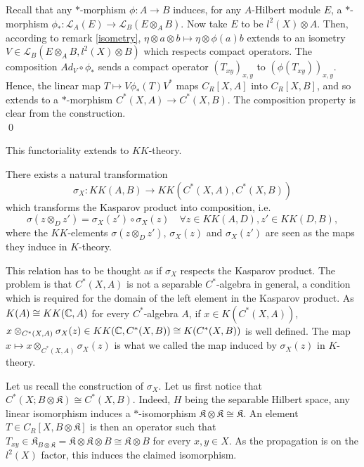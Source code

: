 \begin{dem}
Recall that any $*$-morphism $\phi : A\rightarrow B$ induces, for any $A$-Hilbert module $E$, a $*$-morphism $\phi_* : \mathcal L_A(E)\rightarrow \mathcal L_B(E\otimes_A B)$. Now take $E$ to be $l^2(X)\otimes A$. Then, according to remark \ref{isometry}, $\eta\otimes a\otimes b\mapsto \eta \otimes\phi(a) b $ extends to an isometry $V\in \mathcal L_B(E\otimes_A B,l^2(X)\otimes B)$ which respects compact operators. The composition $Ad_V\circ\phi_*$ sends a compact operator $(T_{xy})_{x,y}$ to $(\phi(T_{xy}))_{x,y}$.\\

Hence, the linear map $T \mapsto V\phi_*(T)V^*$ maps $C_R[X,A]$ into $C_R[X,B]$, and so extends to a $*$-morphism $C^*(X,A)\rightarrow C^*(X,B)$. The composition property is clear from the construction.\\
\qed
\end{dem}
This functoriality extends to $KK$-theory.

\begin{thm}\label{sigma} There exists a natural transformation 
\[\sigma_X : KK(A,B)\rightarrow KK(C^*(X,A),C^*(X,B))\]
which transforms the Kasparov product into composition, i.e. 
\[\sigma(z\otimes_D z')= \sigma_X(z')\circ \sigma_X(z) \quad \forall z\in KK(A,D),z'\in KK(D,B),\]
where the $KK$-elements $\sigma(z\otimes_D z')$, $ \sigma_X(z)$ and $\sigma_X(z')$ are seen as the maps they induce in $K$-theory. 
\end{thm}

\begin{rk}
This relation has to be thought as if $\sigma_X$ respects the Kasparov product. The problem is that $C^*(X,A)$ is not a separable $C^*$-algebra in general, a condition which is required for the domain of the left element in the Kasparov product. As $K(A) \cong KK(\mathbb C,A)$ for every $C^*$-algebra $A$, if $x\in K(C^*(X,A))$, $x\otimes_{C^*(X,A)}\sigma_X(z)\in KK(\mathbb C,C^*(X,B))\cong K(C^*(X,B))$ is well defined. The map $x\mapsto x\otimes_{C^*(X,A)}\sigma_X(z)$ is what we called the map induced by $\sigma_X(z)$ in $K$-theory.
\end{rk}

Let us recall the construction of $\sigma_X$. Let us first notice that $C^*(X;B\otimes\mathfrak K)\cong C^*(X,B)$. Indeed, $H$ being the separable Hilbert space, any linear isomorphism induces a $*$-isomorphism $\mathfrak K \otimes \mathfrak K \cong \mathfrak K$. An element $T\in C_R[X,B\otimes\mathfrak K]$ is then an operator such that $T_{xy}\in \mathfrak K_{B\otimes\mathfrak K}= \mathfrak K\otimes \mathfrak K \otimes B \cong \mathfrak K\otimes B$ for every $x,y\in X$. As the propagation is on the $l^2(X)$ factor, this induces the claimed isomorphism. \\

